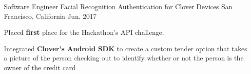 \begin{cventries}


\cventry
{Software Engineer} %
{Facial Recognition Authentication for Clover Devices} %
{San Francisco, California} %
{Jun. 2017} %
{ %
\begin{cvitems}
\item {Placed \textbf{first} place for the Hackathon's API challenge.}
\item {Integrated \textbf{Clover's Android SDK} to create a custom tender option that takes a picture of the person checking out to identify whether or not the person is the owner of the credit card}
\end{cvitems}
}

\end{cventries}
